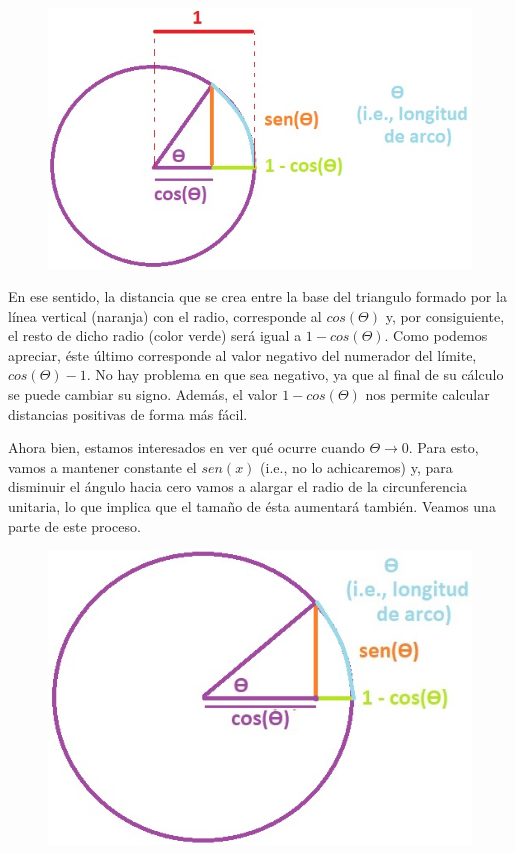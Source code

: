 \documentclass[12pt]{article}
\begin{document}
\newpage

\begin{figure}[hbt!]
\centering
\includegraphics[scale=0.7]{img/geom_proof_cos_1.jpg}
\end{figure}

En ese sentido, la distancia que se crea entre la base del triangulo formado por la línea vertical (naranja) con el radio, corresponde al $cos(\Theta)$ y, por consiguiente, el resto de dicho radio (color verde) será igual a $1 - cos(\Theta)$. Como podemos apreciar, éste último corresponde al valor negativo del numerador del límite, $cos(\Theta) - 1$. No hay problema en que sea negativo, ya que al final de su cálculo se puede cambiar su signo. Además, el valor $1 - cos(\Theta)$ nos permite calcular distancias positivas de forma más fácil.

Ahora bien, estamos interesados en ver qué ocurre cuando $\Theta \to 0$. Para esto, vamos a mantener constante el $sen(x)$ (i.e., no lo achicaremos) y, para disminuir el ángulo hacia cero vamos a alargar el radio de la circunferencia unitaria, lo que implica que el tamaño de ésta aumentará también. Veamos una parte de este proceso.

\newpage

\begin{figure}[hbt!]
\centering
\includegraphics[scale=0.7]{img/geom_proof_cos_2.jpg}
\end{figure}
\end{document}

